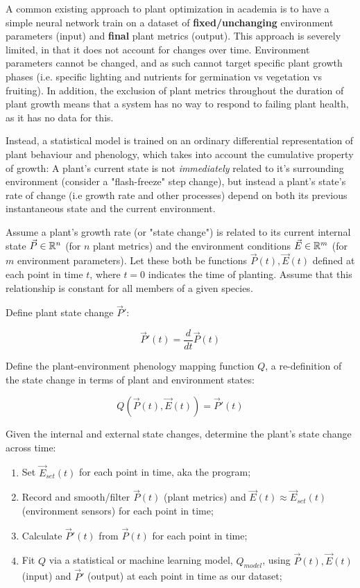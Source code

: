 \documentclass{report}
\begin{document}
\begin{spacing}{0.5}
A common existing approach to plant optimization in academia is to have a simple neural network train on a dataset of \textbf{fixed/unchanging} environment parameters (input) and \textbf{final} plant metrics (output). This approach is severely limited, in that it does not account for changes over time. Environment parameters cannot be changed, and as such cannot target specific plant growth phases (i.e. specific lighting and nutrients for germination vs vegetation vs fruiting). In addition, the exclusion of plant metrics throughout the duration of plant growth means that a system has no way to respond to failing plant health, as it has no data for this.

Instead, a statistical model is trained on an ordinary differential representation of plant behaviour and phenology, which takes into account the cumulative property of growth: A plant's current state is not \textit{immediately} related to it's surrounding environment (consider a "flash-freeze" step change), but instead a plant's state's rate of change (i.e growth rate and other processes) depend on both its previous instantaneous state and the current environment.

Assume a plant's growth rate (or "state change") is related to its current internal state $\vec P \in \mathbb R^n$ (for $n$ plant metrics) and the environment conditions $\vec E \in \mathbb R^m$ (for $m$ environment parameters). Let these both be functions $\vec P (t),\vec E(t)$ defined at each point in time $t$, where $t=0$ indicates the time of planting. Assume that this relationship is constant for all members of a given species.

Define plant state change $\vec P'$: 

$$\vec P'(t) = \frac{d}{dt}\vec P(t)$$

Define the plant-environment phenology mapping function $Q$, a re-definition of the state change in terms of plant and environment states: 

$$Q(\vec P(t), \vec E(t))=\vec P'(t)$$ 

Given the internal and external state changes, determine the plant's state change across time:

\begin{enumerate}
    \item Set $\vec E_{set}(t)$ for each point in time, aka the program;
    \item Record and smooth/filter $\vec P(t)$ (plant metrics) and $\vec E(t)\approx \vec E_{set}(t)$ (environment sensors) for each point in time;
    \item Calculate $\vec P'(t)$ from $\vec P(t)$ for each point in time;
    \item Fit $Q$ via a statistical or machine learning model, $Q_{model}$, using $\vec P(t),\vec E(t)$ (input) and $\vec P'$ (output) at each point in time as our dataset;
\end{enumerate}


\end{spacing}
\end{document}
